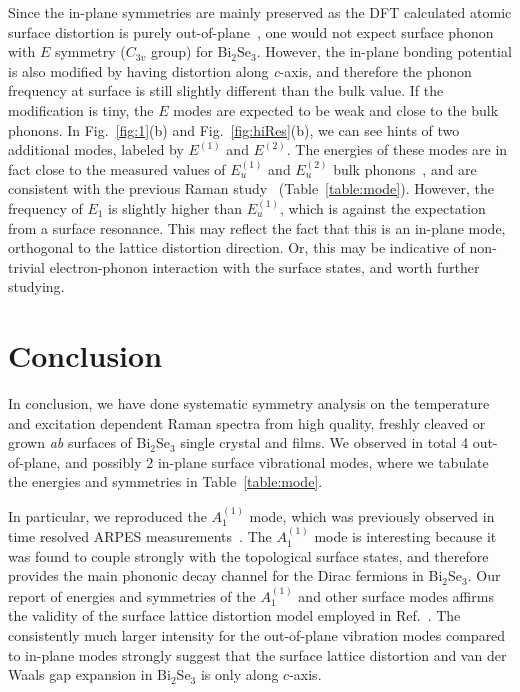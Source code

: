 \documentclass[reprint,aps,pra,superscriptaddress,amsmath,amssymb,linenumbers,longbibliography]{revtex4-1}
\begin{document}
Since the in-plane symmetries are mainly preserved as the DFT calculated atomic surface distortion is purely out-of-plane~\cite{Sobota2014}, one would not expect surface phonon with $E$ symmetry ($C_{3v}$ group) for Bi$_2$Se$_3$.
However, the in-plane bonding potential is also modified by having distortion along \textit{c}-axis, and therefore the phonon frequency at surface is still slightly different than the bulk value.
If the modification is tiny, the $E$ modes are expected to be weak and close to the bulk phonons.
In Fig.~\ref{fig:1}(b) and Fig.~\ref{fig:hiRes}(b), we can see hints of two additional modes, labeled by $E^{(1)}$ and $E^{(2)}$.
The energies of these modes are in fact close to the measured values of $E_{u}^{(1)}$ and $E_{u}^{(2)}$ bulk phonons~\cite{Richter1977,LaForge2010}, and are consistent with the previous Raman study~\cite{Gnezdilov2011} (Table~\ref{table:mode}).
However, the frequency of $E_1$ is slightly higher than $E_{u}^{(1)}$, which is against the expectation from a surface resonance.
This may reflect the fact that this is an in-plane mode, orthogonal to the lattice distortion direction.
Or, this may be indicative of non-trivial electron-phonon interaction with the surface states, and worth further studying. 

\section{Conclusion}\label{sec:Conclusion}
In conclusion, we have done systematic symmetry analysis on the temperature and excitation dependent Raman spectra from high quality, freshly cleaved or grown \textit{ab} surfaces of Bi$_2$Se$_3$ single crystal and films.
We observed in total 4 out-of-plane, and possibly 2 in-plane surface vibrational modes, where we tabulate the energies and symmetries in Table~\ref{table:mode}.

In particular, we reproduced the $A_1^{(1)}$ mode, which was previously observed in time resolved ARPES measurements~\cite{Sobota2014}.
The $A_1^{(1)}$ mode is interesting because it was found to couple strongly with the topological surface states, and therefore provides the main phononic decay channel for the Dirac fermions in Bi$_2$Se$_3$.
Our report of energies and symmetries of the $A_1^{(1)}$ and other surface modes affirms the validity of the surface lattice distortion model employed in Ref.~\cite{Sobota2014}.
The consistently much larger intensity for the out-of-plane vibration modes compared to in-plane modes strongly suggest that the surface lattice distortion and van der Waals gap expansion in Bi$_2$Se$_3$ is only along $c$-axis.
\end{document}
